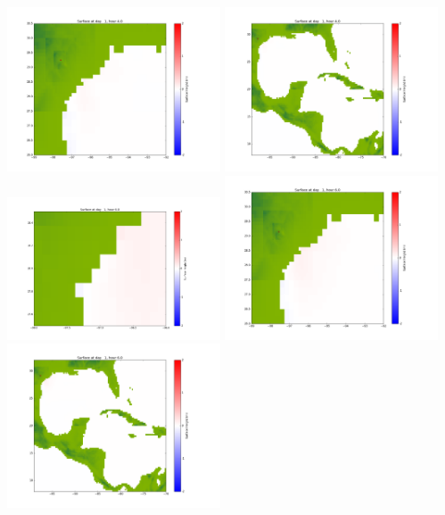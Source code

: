 \documentclass[11pt]{article}
\begin{document}
\includegraphics[width=0.475\textwidth]{frame0038fig1002.png}
\vskip 10pt 
\includegraphics[width=0.475\textwidth]{frame0038fig1003.png}
\vskip 10pt 
\includegraphics[width=0.475\textwidth]{frame0039fig1001.png}
\includegraphics[width=0.475\textwidth]{frame0039fig1002.png}
\vskip 10pt 
\includegraphics[width=0.475\textwidth]{frame0039fig1003.png}
\end{document}
